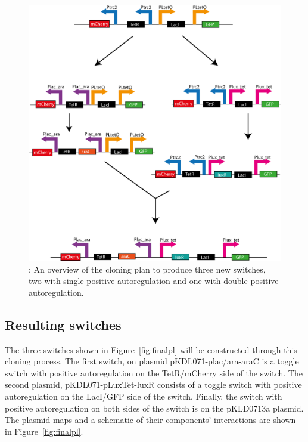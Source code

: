 \begin{figure}[t]
	\begin{center}
		\includegraphics[scale=0.7]{../../chapters/chapterDesignSwitches/images/switches_cloning_big.png}
		\caption[Cloning plan overview]{\label{fig:plan}: An overview of the cloning plan to produce three new switches, two with single positive autoregulation and one with double positive autoregulation.}
	\end{center}
\end{figure}
\clearpage

\subsection{Resulting switches}
The three switches shown in Figure~\ref{fig:finalpl} will be constructed through this cloning process. The first switch, on plasmid pKDL071-plac/ara-araC is a toggle switch with positive autoregulation on the TetR/mCherry side of the switch. The second plasmid, pKDL071-pLuxTet-luxR consists of a toggle switch with positive autoregulation on the LacI/GFP side of the switch. Finally, the switch with positive autoregulation on both sides of the switch is on the pKLD0713a plasmid. The plasmid maps and a schematic of their components' interactions are shown in Figure~\ref{fig:finalpl}. 

